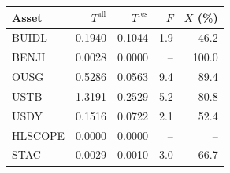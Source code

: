 \begin{tabular}{@{}lrrrr@{}}
\toprule
Asset & $T^{\mathrm{all}}$ & $T^{\mathrm{res}}$ & $F$ & $X$ (\%) \\
\midrule
BUIDL & 0.1940 & 0.1044 & 1.9 & 46.2 \\
BENJI & 0.0028 & 0.0000 & -- & 100.0 \\
OUSG & 0.5286 & 0.0563 & 9.4 & 89.4 \\
USTB & 1.3191 & 0.2529 & 5.2 & 80.8 \\
USDY & 0.1516 & 0.0722 & 2.1 & 52.4 \\
HLSCOPE & 0.0000 & 0.0000 & -- & -- \\
STAC & 0.0029 & 0.0010 & 3.0 & 66.7 \\
\bottomrule
\end{tabular}
